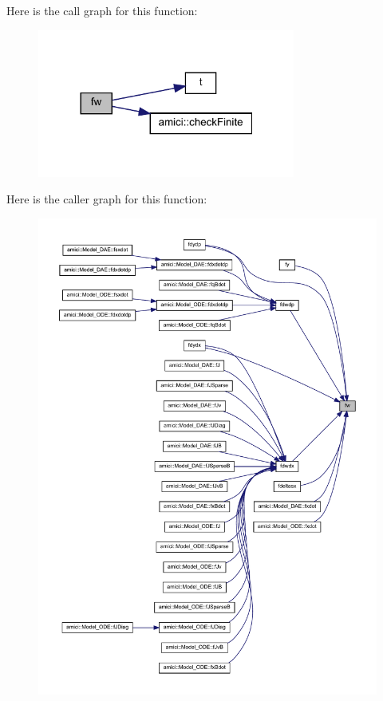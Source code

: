 Here is the call graph for this function\+:
\nopagebreak
\begin{figure}[H]
\begin{center}
\leavevmode
\includegraphics[width=240pt]{classamici_1_1_model_a7e63009c65fc1361cc5a6e1fc3d5ff1a_cgraph}
\end{center}
\end{figure}
Here is the caller graph for this function\+:
\nopagebreak
\begin{figure}[H]
\begin{center}
\leavevmode
\includegraphics[width=350pt]{classamici_1_1_model_a7e63009c65fc1361cc5a6e1fc3d5ff1a_icgraph}
\end{center}
\end{figure}
\mbox{\label{classamici_1_1_model_a7a8903313cd31dad4fa580c0e434bb1c}} 
